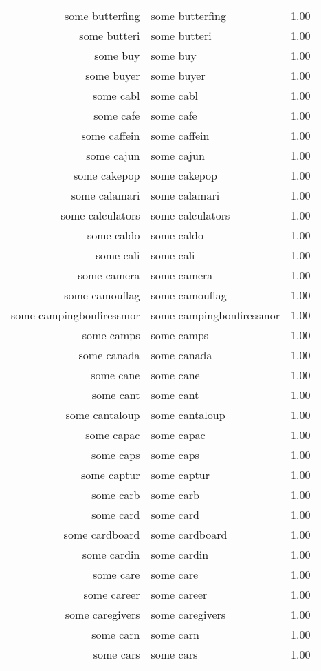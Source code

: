 \begin{table}[ht]
\begin{tabular}{rlr}
  some butterfing & some butterfing & 1.00 \\ 
  some butteri & some butteri & 1.00 \\ 
  some buy & some buy & 1.00 \\ 
  some buyer & some buyer & 1.00 \\ 
  some cabl & some cabl & 1.00 \\ 
  some cafe & some cafe & 1.00 \\ 
  some caffein & some caffein & 1.00 \\ 
  some cajun & some cajun & 1.00 \\ 
  some cakepop & some cakepop & 1.00 \\ 
  some calamari & some calamari & 1.00 \\ 
  some calculators & some calculators & 1.00 \\ 
  some caldo & some caldo & 1.00 \\ 
  some cali & some cali & 1.00 \\ 
  some camera & some camera & 1.00 \\ 
  some camouflag & some camouflag & 1.00 \\ 
  some campingbonfiressmor & some campingbonfiressmor & 1.00 \\ 
  some camps & some camps & 1.00 \\ 
  some canada & some canada & 1.00 \\ 
  some cane & some cane & 1.00 \\ 
  some cant & some cant & 1.00 \\ 
  some cantaloup & some cantaloup & 1.00 \\ 
  some capac & some capac & 1.00 \\ 
  some caps & some caps & 1.00 \\ 
  some captur & some captur & 1.00 \\ 
  some carb & some carb & 1.00 \\ 
  some card & some card & 1.00 \\ 
  some cardboard & some cardboard & 1.00 \\ 
  some cardin & some cardin & 1.00 \\ 
  some care & some care & 1.00 \\ 
  some career & some career & 1.00 \\ 
  some caregivers & some caregivers & 1.00 \\ 
  some carn & some carn & 1.00 \\ 
  some cars & some cars & 1.00 \\ 

\end{tabular}
\end{table}
